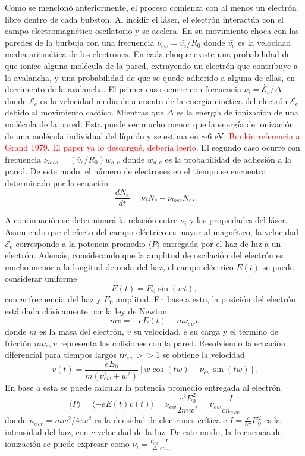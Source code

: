 \documentclass[aps,prb,onecolumn,superscriptaddress,floatfix,longbibliography,10pt]{revtex4-2}
\newif\ifptitle
\newif\ifpnumber
\newcounter{para}
\newcommand\ptitle[1]{\par\refstepcounter{para}
{\ifpnumber{\noindent\textcolor{lightgray}{\textbf{\thepara}}\indent}\fi}
{\ifptitle{\textbf{[{#1}]}}\fi}}
\begin{document}
Como se mencionó anteriormente, el proceso comienza con al menos un electrón libre dentro de cada bubston. Al incidir el láser, el electrón interactúa con el campo electromagnético oscilatorio y se acelera. En su movimiento choca con las paredes de la burbuja con una frecuencia $\nu_{e w} = \bar{v_e}/R_0$ donde $\bar{v_e}$ es la velocidad media aritmética de los electrones. En cada choque existe una probabilidad de que ionice alguna molécula de la pared, extrayendo un electrón que contribuye a la avalancha, y una probabilidad de que se quede adherido a alguna de ellas, en decrimento de la avalancha. El primer caso ocurre con frecuencia $\nu_i = \dot{\mathcal{E}_e}/\Delta$ donde $\dot{\mathcal{E}_e}$ es la velocidad media de aumento de la energía cinética del electrón ${\mathcal{E}_e}$ debido al movimiento caótico. Mientras que $\Delta$ es la energía de ionización de una molécula de la pared. Esta puede ser mucho menor que la energía de ionización de una molécula individual del líquido y se estima en $\sim 6$ eV. \textcolor{red}{Bunkin referencia a Grand 1979. El paper ya lo descargué, debería leerlo}. El segundo caso ocurre con frecuencia $\nu_{loss} = (\bar{v}_e/R_0) w_{a,e}$ donde $w_{a,e}$ es la probabilidad de adhesión a la pared. De este modo, el número de electrones en el tiempo se encuentra determinado por la ecuación
\begin{equation}
  \frac{dN_e}{dt} = \nu_i N_e - \nu_{loss} N_e.
  \label{eq:dNedt_1}
\end{equation}


\ptitle{Determinación de la frecuencia de ionización}


A continuación se determinará la relación entre $\nu_i$ y las propiedades del láser. Asumiendo que el efecto del campo eléctrico es mayor al magnético, la velocidad $\dot{\mathcal{E}_e}$ corresponde a la potencia promedio $\langle P \rangle$ entregada por el haz de luz a un electrón. Además, considerando que la amplitud de oscilación del electrón es mucho menor a la longitud de onda del haz, el campo eléctrico $E(t)$ se puede considerar uniforme
\[E(t) = E_0 \sin{(w t)},\]
con $w$ frecuencia del haz y $E_0$ amplitud. En base a esto, la posición del electrón está dada clásicamente por la ley de Newton
\[m \dot{v} = -e E(t) -m \nu_{e w} v\]
donde $m$ es la masa del electrón, $v$ su velocidad, $e$ su carga y el término de fricción $m \nu_{e w} v$ representa las colisiones con la pared. Resolviendo la ecuación diferencial para tiempos largos $t \nu_{e w} >> 1$ se obtiene la velocidad
\[v(t) = \frac{e E_0}{m(\nu_{e w}^2 + w^2)}[w \cos{(t w)} - \nu_{e w} \sin{(t w)}]. \]
En base a esta se puede calcular la potencia promedio entregada al electrón 
\[\langle P \rangle = \langle - e E(t) v(t) \rangle = \nu_{e w}\frac{e^2 E_0^2}{2 m w^2} = \nu_{e w} \frac{I}{c n_{e \, cr}}\]
donde $n_{e \, cr} = mw^2/4 \pi e^2$ es la densidad de electrones crítica e $I = \frac{c}{8 \pi} E_0^2$ es la intensidad del haz, con $c$ velocidad de la luz. De este modo, la frecuencia de ionización se puede expresar como $\nu_i = \frac{\nu_{e w}}{\Delta} \frac{I}{c n_{e \, cr}}$
\end{document}

